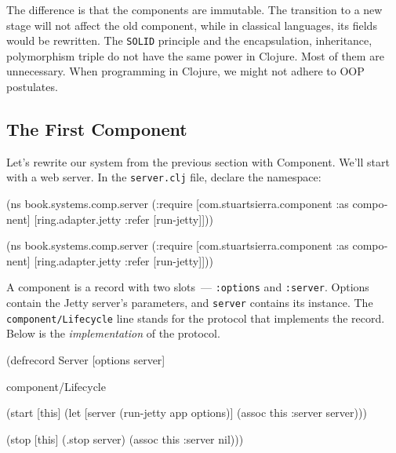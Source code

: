 
The difference is that the components are immutable. The transition to a new stage will not affect the old component, while in classical languages, its fields would be rewritten. The \verb|SOLID| principle and the encapsulation, inheritance, polymorphism triple do not have the same power in Clojure. Most of them are unnecessary. When programming in Clojure, we might not adhere to OOP postulates.

\subsection{The First Component}

Let's rewrite our system from the previous section with Component. We'll start with a web server. In the \verb|server.clj| file, declare the namespace:

\ifnarrow

\begin{english}
  \begin{clojure}
(ns book.systems.comp.server
  (:require
   [com.stuartsierra.component
    :as component]
   [ring.adapter.jetty
    :refer [run-jetty]]))
  \end{clojure}
\end{english}

\else

\begin{english}
  \begin{clojure}
(ns book.systems.comp.server
  (:require
   [com.stuartsierra.component :as component]
   [ring.adapter.jetty :refer [run-jetty]]))
  \end{clojure}
\end{english}

\fi

A component is a record with two slots~--- \verb|:options| and \verb|:server|. Options contain the Jetty server's parameters, and \verb|server| contains its instance. The \verb|component/Lifecycle| line stands for the protocol that implements the record. Below is the \emph{implementation} of the protocol.

\ifnarrow

\begin{english}
  \begin{clojure}
(defrecord Server [options server]

  component/Lifecycle

  (start [this]
    (let [server (run-jetty app
                   options)]
      (assoc this :server server)))

  (stop [this]
    (.stop server)
    (assoc this :server nil)))
  \end{clojure}
\end{english}

